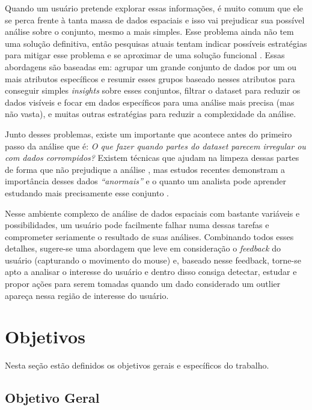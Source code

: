 Quando um usuário pretende explorar essas informações, é muito comum que ele se perca frente à tanta massa de dados espaciais e isso vai prejudicar sua possível análise sobre o conjunto, mesmo a mais simples. Esse problema ainda não tem uma solução definitiva, então pesquisas atuais tentam indicar possíveis estratégias para mitigar esse problema e se aproximar de uma solução funcional \cite{Lisowski:2017}. Essas abordagens são baseadas em: agrupar um grande conjunto de dados por um ou mais atributos específicos e resumir esses grupos baseado nesses atributos para conseguir simples \textit{insights} sobre esses conjuntos, filtrar o dataset para reduzir os dados visíveis e focar em dados específicos para uma análise mais precisa (mas não vasta), e muitas outras estratégias para reduzir a complexidade da análise.

Junto desses problemas, existe um importante que acontece antes do primeiro passo da análise que é: \textit{O que fazer quando partes do dataset parecem irregular ou com dados corrompidos?} Existem técnicas que ajudam na limpeza dessas partes de forma que não prejudique a análise \cite{10.1007/978-3-319-11116-2_2}, mas estudos recentes demonstram a importância desses dados \textit{``anormais''} e o quanto um analista pode aprender estudando mais precisamente esse conjunto \cite{DBLP:journals/debu/FreireCVZ16}.

Nesse ambiente complexo de análise de dados espaciais com bastante variáveis e possibilidades, um usuário pode facilmente falhar numa dessas tarefas e comprometer seriamente o resultado de suas análises. Combinando todos esses detalhes, sugere-se uma abordagem que leve em consideração o \textit{feedback} do usuário (capturando o movimento do mouse) e, baseado nesse feedback, torne-se apto a analisar o interesse do usuário e dentro disso consiga detectar, estudar e propor ações para serem tomadas quando um dado considerado um outlier apareça nessa região de interesse do usuário.

\section{Objetivos}

Nesta seção estão definidos os objetivos gerais e específicos do trabalho.

\subsection{Objetivo Geral}

